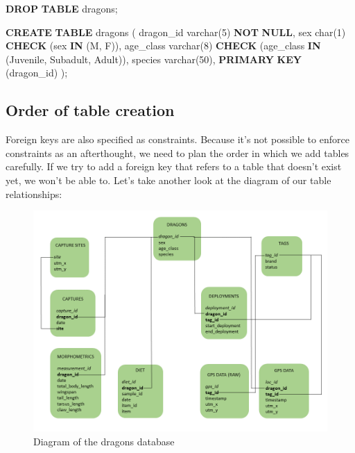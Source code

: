 \documentclass[
]{book}
\newenvironment{Shaded}{\begin{snugshade}}{\end{snugshade}}
\newcommand{\DataTypeTok}[1]{\textcolor[rgb]{0.13,0.29,0.53}{#1}}
\newcommand{\DecValTok}[1]{\textcolor[rgb]{0.00,0.00,0.81}{#1}}
\newcommand{\KeywordTok}[1]{\textcolor[rgb]{0.13,0.29,0.53}{\textbf{#1}}}
\newcommand{\NormalTok}[1]{#1}
\newcommand{\StringTok}[1]{\textcolor[rgb]{0.31,0.60,0.02}{#1}}
\begin{document}
\begin{Shaded}
\begin{Highlighting}[]

\KeywordTok{DROP} \KeywordTok{TABLE}\NormalTok{ dragons;}

\KeywordTok{CREATE} \KeywordTok{TABLE}\NormalTok{ dragons (}
\NormalTok{dragon\_id }\DataTypeTok{varchar}\NormalTok{(}\DecValTok{5}\NormalTok{) }\KeywordTok{NOT} \KeywordTok{NULL}\NormalTok{,}
\NormalTok{sex }\DataTypeTok{char}\NormalTok{(}\DecValTok{1}\NormalTok{) }\KeywordTok{CHECK}\NormalTok{ (sex }\KeywordTok{IN}\NormalTok{ (}\StringTok{\textquotesingle{}M\textquotesingle{}}\NormalTok{, }\StringTok{\textquotesingle{}F\textquotesingle{}}\NormalTok{)),}
\NormalTok{age\_class }\DataTypeTok{varchar}\NormalTok{(}\DecValTok{8}\NormalTok{) }\KeywordTok{CHECK}\NormalTok{ (age\_class }\KeywordTok{IN}\NormalTok{ (}\StringTok{\textquotesingle{}Juvenile\textquotesingle{}}\NormalTok{, }\StringTok{\textquotesingle{}Subadult\textquotesingle{}}\NormalTok{, }\StringTok{\textquotesingle{}Adult\textquotesingle{}}\NormalTok{)),}
\NormalTok{species }\DataTypeTok{varchar}\NormalTok{(}\DecValTok{50}\NormalTok{),}
\KeywordTok{PRIMARY} \KeywordTok{KEY}\NormalTok{ (dragon\_id)}
\NormalTok{);}
\end{Highlighting}
\end{Shaded}

\hypertarget{order-of-table-creation}{%
\subsection{Order of table creation}\label{order-of-table-creation}}

Foreign keys are also specified as constraints. Because it's not possible to
enforce constraints as an afterthought, we need to plan the order in which we
add tables carefully. If we try to add a foreign key that refers to a table that
doesn't exist yet, we won't be able to. Let's take another look at the diagram
of our table relationships:

\begin{figure}

{\centering \includegraphics[width=0.8\linewidth]{img/database_diagram} 

}

\caption{Diagram of the dragons database}\label{fig:db-diagram2}
\end{figure}
\end{document}
